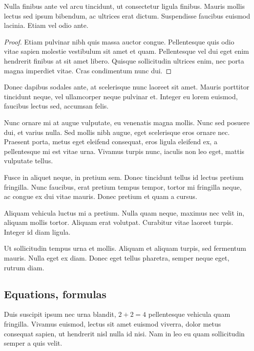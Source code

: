 
\begin{theorem}
Nulla finibus ante vel arcu tincidunt, ut consectetur ligula finibus. Mauris mollis lectus sed ipsum bibendum, ac ultrices erat dictum. Suspendisse faucibus euismod lacinia. Etiam vel odio ante.
\end{theorem}
\begin{proof}
Etiam pulvinar nibh quis massa auctor congue. Pellentesque quis odio vitae sapien molestie vestibulum sit amet et quam. Pellentesque vel dui eget enim hendrerit finibus at sit amet libero. Quisque sollicitudin ultrices enim, nec porta magna imperdiet vitae. Cras condimentum nunc dui.
\end{proof}

Donec dapibus sodales ante, at scelerisque nunc laoreet sit amet. Mauris porttitor tincidunt neque, vel ullamcorper neque pulvinar et. Integer eu lorem euismod, faucibus lectus sed, accumsan felis. 

\begin{remark}
Nunc ornare mi at augue vulputate, eu venenatis magna mollis. Nunc sed posuere dui, et varius nulla. Sed mollis nibh augue, eget scelerisque eros ornare nec. Praesent porta, metus eget eleifend consequat, eros ligula eleifend ex, a pellentesque mi est vitae urna. Vivamus turpis nunc, iaculis non leo eget, mattis vulputate tellus.
\end{remark}

Fusce in aliquet neque, in pretium sem. Donec tincidunt tellus id lectus pretium fringilla. Nunc faucibus, erat pretium tempus tempor, tortor mi fringilla neque, ac congue ex dui vitae mauris. Donec pretium et quam a cursus.

\begin{note}
Aliquam vehicula luctus mi a pretium. Nulla quam neque, maximus nec velit in, aliquam mollis tortor. Aliquam erat volutpat. Curabitur vitae laoreet turpis. Integer id diam ligula.
\end{note}

Ut sollicitudin tempus urna et mollis. Aliquam et aliquam turpis, sed fermentum mauris. Nulla eget ex diam. Donec eget tellus pharetra, semper neque eget, rutrum diam.

\subsection{Equations, formulas}

Duis suscipit ipsum nec urna blandit, $2 + 2 = 4$ pellentesque vehicula quam fringilla. Vivamus euismod, lectus sit amet euismod viverra, dolor metus consequat sapien, ut hendrerit nisl nulla id nisi. Nam in leo eu quam sollicitudin semper a quis velit.

